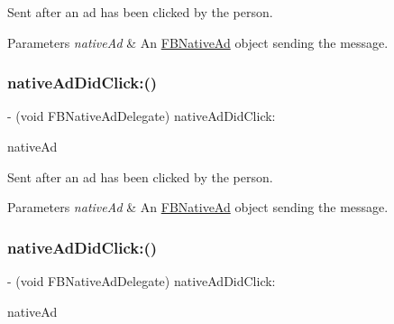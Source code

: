 Sent after an ad has been clicked by the person.


\begin{DoxyParams}{Parameters}
{\em native\+Ad} & An \hyperlink{interfaceFBNativeAd}{F\+B\+Native\+Ad} object sending the message. \\
\hline
\end{DoxyParams}
\mbox{\label{protocolFBNativeAdDelegate_01-p_a6f95570584b282e947d029d855242d11}} 
\subsubsection{\texorpdfstring{native\+Ad\+Did\+Click\+:()}{nativeAdDidClick:()}\hspace{0.1cm}{\footnotesize\ttfamily [4/5]}}
{\footnotesize\ttfamily -\/ (void F\+B\+Native\+Ad\+Delegate) native\+Ad\+Did\+Click\+: \begin{DoxyParamCaption}\item[{(\hyperlink{interfaceFBNativeAd}{F\+B\+Native\+Ad} $\ast$)}]{native\+Ad }\end{DoxyParamCaption}}

Sent after an ad has been clicked by the person.


\begin{DoxyParams}{Parameters}
{\em native\+Ad} & An \hyperlink{interfaceFBNativeAd}{F\+B\+Native\+Ad} object sending the message. \\
\hline
\end{DoxyParams}
\mbox{\label{protocolFBNativeAdDelegate_01-p_a6f95570584b282e947d029d855242d11}} 
\subsubsection{\texorpdfstring{native\+Ad\+Did\+Click\+:()}{nativeAdDidClick:()}\hspace{0.1cm}{\footnotesize\ttfamily [5/5]}}
{\footnotesize\ttfamily -\/ (void F\+B\+Native\+Ad\+Delegate) native\+Ad\+Did\+Click\+: \begin{DoxyParamCaption}\item[{(\hyperlink{interfaceFBNativeAd}{F\+B\+Native\+Ad} $\ast$)}]{native\+Ad }\end{DoxyParamCaption}}


